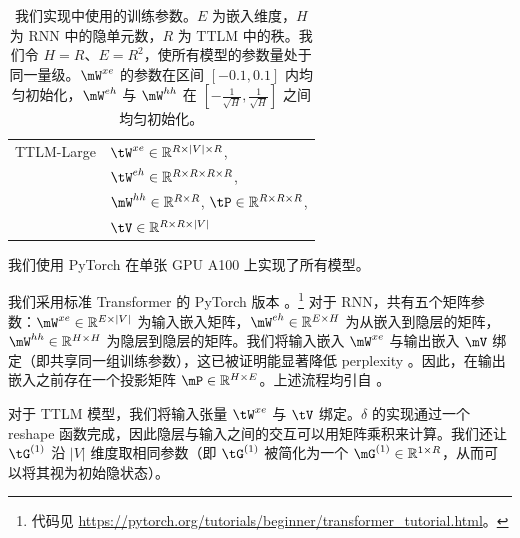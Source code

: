 \begin{table}[ht]
\begin{tabular}{ll}
        \hline
        TTLM-Large & $\tW^{xe}\in\mathbb{R}^{R\times |V|\times R}$, \\ & $\tW^{eh}\in\mathbb{R}^{R\times R\times R\times R}$, \\
        & $\mW^{hh}\in\mathbb{R}^{R\times R}$, $\tP\in\mathbb{R}^{R\times R\times R}$, \\
        &  $\tV\in\mathbb{R}^{R\times R\times |V|}$\\
    \bottomrule
    \end{tabular}
    \caption{我们实现中使用的训练参数。$E$ 为嵌入维度，$H$ 为 RNN 中的隐单元数，$R$ 为 TTLM 中的秩。我们令 $H=R$、$E=R^2$，使所有模型的参数量处于同一量级。$\mW^{xe}$ 的参数在区间 $[-0.1,0.1]$ 内均匀初始化，$\mW^{eh}$ 与 $\mW^{hh}$ 在 $[-\frac{1}{\sqrt{H}}, \frac{1}{\sqrt{H}}]$ 之间均匀初始化。}
    \label{tab:my_label}
\end{table}

我们使用 PyTorch 在单张 GPU A100 上实现了所有模型。

我们采用标准 Transformer 的 PyTorch 版本 \citep{vaswani2017attention}。\footnote{代码见 \url{https://pytorch.org/tutorials/beginner/transformer_tutorial.html}。} 对于 RNN，共有五个矩阵参数：$\mW^{xe}\in \mathbb{R}^{E\times |V|}$ 为输入嵌入矩阵，$\mW^{eh}\in
\mathbb{R}^{E\times H}$ 为从嵌入到隐层的矩阵，$\mW^{hh}\in \mathbb{R}^{H\times H}$ 为隐层到隐层的矩阵。我们将输入嵌入 $\mW^{xe}$ 与输出嵌入 $\mV$ 绑定（即共享同一组训练参数），这已被证明能显著降低 perplexity \citep{press2016using}。因此，在输出嵌入之前存在一个投影矩阵 $\mP\in\mathbb{R}^{H\times E}$。上述流程均引自 \citep{press2016using}。

对于 TTLM 模型，我们将输入张量 $\tW^{xe}$ 与 $\tV$ 绑定。$\delta$ 的实现通过一个 reshape 函数完成，因此隐层与输入之间的交互可以用矩阵乘积来计算。我们还让 $\tG^{(1)}$ 沿 $|V|$ 维度取相同参数（即 $\tG^{(1)}$ 被简化为一个 $\mG^{(1)}\in\mathbb{R}^{1\times R}$，从而可以将其视为初始隐状态）。
